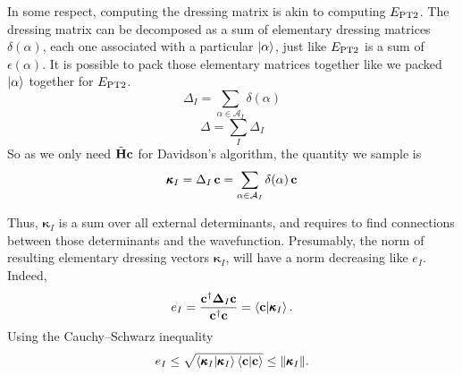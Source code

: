 \documentclass[./thesis.tex]{subfiles}
\begin{document}
In some respect, computing the dressing matrix is akin to computing $E_\text{PT2}$. The dressing matrix can be decomposed as a sum of elementary dressing matrices $\delta(\alpha)$, each one associated with a particular $\ket \alpha$, just like $E_\text{PT2}$ is a sum of $\epsilon(\alpha)$. It is possible to pack those elementary matrices together like we packed $\ket \alpha$ together for $E_\text{PT2}$.
\begin{equation}
\Delta_I = \sum_{\alpha \in \mathcal{A}_I} \delta(\alpha)
\end{equation}
\begin{equation}
\Delta = \sum_{I} \Delta_I
\end{equation}
So as we only need $\tilde{\bf H}{\bf c}$ for Davidson's algorithm, the quantity we sample is 
\begin{equation}
{\pmb \kappa}_I = \Delta_I\, {\bf c} = \sum_{\alpha \in \mathcal{A}_I} \delta(\alpha)\, {\bf c}
\end{equation}

Thus, ${\pmb \kappa}_I$ is a sum over all external determinants, and requires to find connections between those determinants and the wavefunction. Presumably, the norm of resulting elementary dressing vectors $\pmb \kappa_I$, will have a norm decreasing like $e_I$. Indeed, 
\begin{equation}
e_I = \frac{{\bf c}^\dagger {\bf \Delta}_I {\bf c}}{{\bf c}^\dagger {\bf c}} = \braket{\bf c}{\pmb \kappa_I}.
\label{eq:c_kappa_i}
\end{equation}
Using the Cauchy–Schwarz inequality
\begin{equation}
e_I \le \sqrt{ \braket{{\pmb \kappa}_I}{{\pmb \kappa}_I} \braket{\bf c}{\bf c} } \le
\norm{{\pmb \kappa}_I}.
\end{equation}
\end{document}
